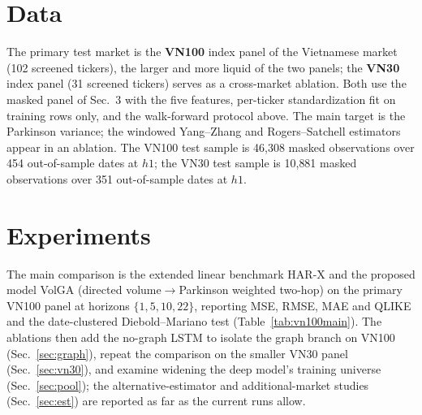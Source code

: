 \documentclass[runningheads]{llncs}
\begin{document}
\section{Data}
The primary test market is the \textbf{VN100} index panel of the Vietnamese market (102 screened
tickers), the larger and more liquid of the two panels; the \textbf{VN30} index panel (31 screened
tickers) serves as a cross-market ablation. Both use the masked panel of Sec.~3 with the five
features, per-ticker standardization fit on training rows only, and the walk-forward protocol above.
The main target is the Parkinson variance; the windowed Yang--Zhang and Rogers--Satchell estimators
appear in an ablation. The VN100 test sample is 46{,}308 masked observations over 454 out-of-sample
dates at $h1$; the VN30 test sample is 10{,}881 masked observations over 351 out-of-sample dates at
$h1$.

\section{Experiments}
The main comparison is the extended linear benchmark HAR-X and the proposed model VolGA (directed
volume$\to$Parkinson weighted two-hop) on the primary VN100 panel at horizons $\{1,5,10,22\}$,
reporting MSE, RMSE, MAE and QLIKE and the date-clustered Diebold--Mariano test (Table~\ref{tab:vn100main}).
The ablations then add the no-graph LSTM to isolate the graph branch on VN100 (Sec.~\ref{sec:graph}),
repeat the comparison on the smaller VN30 panel (Sec.~\ref{sec:vn30}), and examine widening the deep
model's training universe (Sec.~\ref{sec:pool}); the alternative-estimator and additional-market
studies (Sec.~\ref{sec:est}) are reported as far as the current runs allow.
\end{document}
